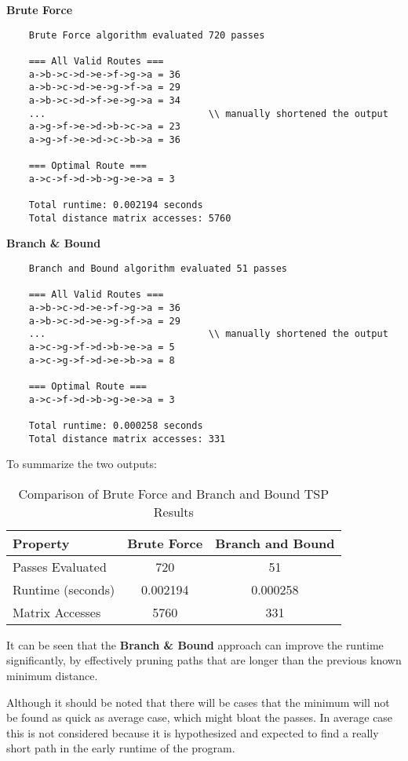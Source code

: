 \textbf{Brute Force}
\begin{verbatim}
    Brute Force algorithm evaluated 720 passes

    === All Valid Routes ===
    a->b->c->d->e->f->g->a = 36
    a->b->c->d->e->g->f->a = 29
    a->b->c->d->f->e->g->a = 34
    ...                             \\ manually shortened the output
    a->g->f->e->d->b->c->a = 23
    a->g->f->e->d->c->b->a = 36
    
    === Optimal Route ===
    a->c->f->d->b->g->e->a = 3
    
    Total runtime: 0.002194 seconds
    Total distance matrix accesses: 5760
\end{verbatim}
\textbf{Branch \& Bound}
\begin{verbatim}
    Branch and Bound algorithm evaluated 51 passes

    === All Valid Routes ===
    a->b->c->d->e->f->g->a = 36
    a->b->c->d->e->g->f->a = 29
    ...                             \\ manually shortened the output
    a->c->g->f->d->b->e->a = 5
    a->c->g->f->d->e->b->a = 8

    === Optimal Route ===
    a->c->f->d->b->g->e->a = 3

    Total runtime: 0.000258 seconds
    Total distance matrix accesses: 331
\end{verbatim}

To summarize the two outputs:

\begin{table}[H]
    \centering
        \begin{tabular}{|l|c|c|}
        \hline
                \textbf{Property} & \textbf{Brute Force} & \textbf{Branch and Bound} \\
            \hline
                Passes Evaluated         & 720   & 51    \\
            \hline
                Runtime (seconds)        & 0.002194 & 0.000258 \\
            \hline
                Matrix Accesses          & 5760  & 331   \\
            \hline
        \end{tabular}
            \caption{Comparison of Brute Force and Branch and Bound TSP Results}
\end{table}
    
It can be seen that the \textbf{Branch \& Bound} approach can improve the runtime significantly, by effectively pruning paths that are longer than the previous known minimum distance.

Although it should be noted that there will be cases that the minimum will not be found as quick as average case, which might bloat the passes. In average case this is not considered because it is hypothesized and expected to find a really short path in the early runtime of the program.
